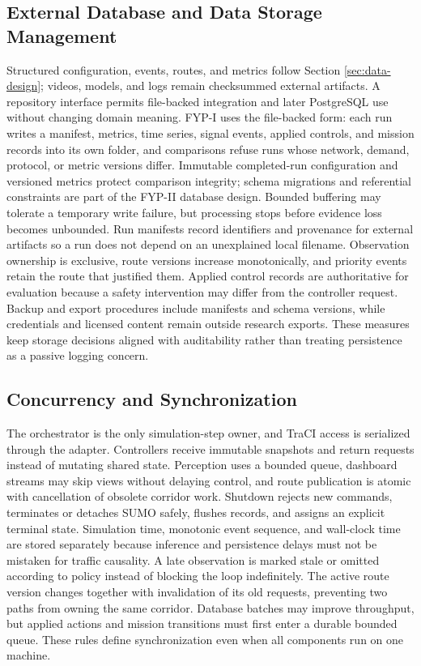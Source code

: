 \subsection{External Database and Data Storage Management}

Structured configuration, events, routes, and metrics follow Section \ref{sec:data-design}; videos, models, and logs remain checksummed external artifacts. A repository interface permits file-backed integration and later PostgreSQL use without changing domain meaning. FYP-I uses the file-backed form: each run writes a manifest, metrics, time series, signal events, applied controls, and mission records into its own folder, and comparisons refuse runs whose network, demand, protocol, or metric versions differ. Immutable completed-run configuration and versioned metrics protect comparison integrity; schema migrations and referential constraints are part of the FYP-II database design. Bounded buffering may tolerate a temporary write failure, but processing stops before evidence loss becomes unbounded. Run manifests record identifiers and provenance for external artifacts so a run does not depend on an unexplained local filename. Observation ownership is exclusive, route versions increase monotonically, and priority events retain the route that justified them. Applied control records are authoritative for evaluation because a safety intervention may differ from the controller request. Backup and export procedures include manifests and schema versions, while credentials and licensed content remain outside research exports. These measures keep storage decisions aligned with auditability rather than treating persistence as a passive logging concern.

\subsection{Concurrency and Synchronization}

The orchestrator is the only simulation-step owner, and TraCI access is serialized through the adapter. Controllers receive immutable snapshots and return requests instead of mutating shared state. Perception uses a bounded queue, dashboard streams may skip views without delaying control, and route publication is atomic with cancellation of obsolete corridor work. Shutdown rejects new commands, terminates or detaches SUMO safely, flushes records, and assigns an explicit terminal state. Simulation time, monotonic event sequence, and wall-clock time are stored separately because inference and persistence delays must not be mistaken for traffic causality. A late observation is marked stale or omitted according to policy instead of blocking the loop indefinitely. The active route version changes together with invalidation of its old requests, preventing two paths from owning the same corridor. Database batches may improve throughput, but applied actions and mission transitions must first enter a durable bounded queue. These rules define synchronization even when all components run on one machine.

